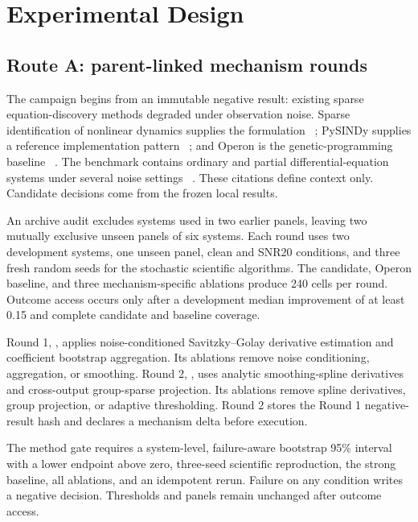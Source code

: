 \section{Experimental Design}
\label{sec:experimental_design}

\subsection{Route A: parent-linked mechanism rounds}

The campaign begins from an immutable negative result: existing sparse
equation-discovery methods degraded under observation noise. Sparse
identification of nonlinear dynamics supplies the formulation
~\cite{brunton2016sindy}; PySINDy supplies a reference implementation pattern
~\cite{desilva2020pysindy}; and Operon is the genetic-programming baseline
~\cite{burlacu2020operon}. The benchmark contains ordinary and partial
differential-equation systems under several noise settings
~\cite{ziaei2025mdbench}. These citations define context only. Candidate
decisions come from the frozen local results.

An archive audit excludes systems used in two earlier panels, leaving two
mutually exclusive unseen panels of six systems. Each round uses two
development systems, one unseen panel, clean and SNR20 conditions, and three
fresh random seeds for the stochastic scientific algorithms. The candidate,
Operon baseline, and three mechanism-specific ablations produce 240 cells per
round. Outcome access occurs only after a development median improvement of at
least 0.15 and complete candidate and baseline coverage.

Round 1, , applies
noise-conditioned Savitzky--Golay derivative estimation and coefficient
bootstrap aggregation. Its ablations remove noise conditioning, aggregation,
or smoothing. Round 2, , uses analytic
smoothing-spline derivatives and cross-output group-sparse projection. Its
ablations remove spline derivatives, group projection, or adaptive
thresholding. Round 2 stores the Round 1 negative-result hash and declares a
mechanism delta before execution.

The method gate requires a system-level, failure-aware bootstrap 95\%
interval with a lower endpoint above zero, three-seed scientific
reproduction, the strong baseline, all ablations, and an idempotent rerun.
Failure on any condition writes a negative decision. Thresholds and panels
remain unchanged after outcome access.

